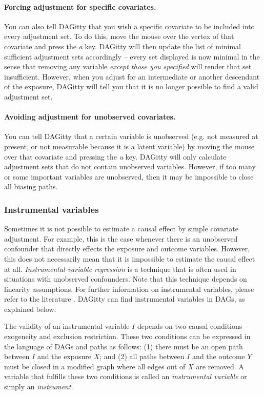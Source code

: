 \documentclass[a4paper]{article} %
\newcommand{\pp}{{\sc DAG}itty\xspace}
\begin{document}
\paragraph{Forcing adjustment for specific covariates.}

You can also tell \pp that you wish a specific covariate
to be included into every adjustment set. To do this, move the
mouse over the vertex of that covariate and press the \emph{a} 
key. \pp will then update the list of minimal sufficient
adjustment sets accordingly -- every set displayed
is now minimal in the sense that removing any variable 
\emph{except those you specified} will render
that set insufficient. However, when you adjust for an intermediate
or another descendant of the exposure, \pp will tell you that it is no longer
possible to find a valid adjustment set.

\paragraph{Avoiding adjustment for unobserved covariates.}

You can tell \pp that a certain variable is unobserved 
(e.g. not measured at present, or not measurable because it is a 
latent variable) by moving the mouse 
over that covariate and pressing the \emph{u} key.
\pp will only calculate adjustment sets that do 
not contain unobserved variables. However, if too many or
some important variables are unobserved, then it may
be impossible to close all biasing paths. 

\subsubsection{Instrumental variables}

Sometimes it is not possible to estimate a causal effect by simple covariate adjustment.
For example, this is the case whenever there is an unobserved confounder that directly
effects the exposure and outcome variables. However, this does not necessarily 
mean that it is impossible to estimate the causal effect at all. 
\emph{Instrumental variable regression} is a technique that is 
often used in situations with unobserved confounders.
Note that this technique depends on linearity assumptions. For further information
on instrumental variables, please refer to the literature \cite{AngristIR96,imbens14}. 
\pp can find instrumental variables in DAGs, as explained below. 

The validity of an instrumental variable $I$ depends on two causal conditions -- 
exogeneity and exclusion restriction. These two conditions can be expressed 
in the language of DAGs and paths as follows: (1) there must be an open path between 
$I$ and the exposure $X$; and (2) all paths between $I$ and the outcome $Y$ must be
closed in a modified graph where all edges out of $X$ are removed. 
A variable that fulfills these two conditions is called an \emph{instrumental variable}
or simply an \emph{instrument}.
\end{document}
